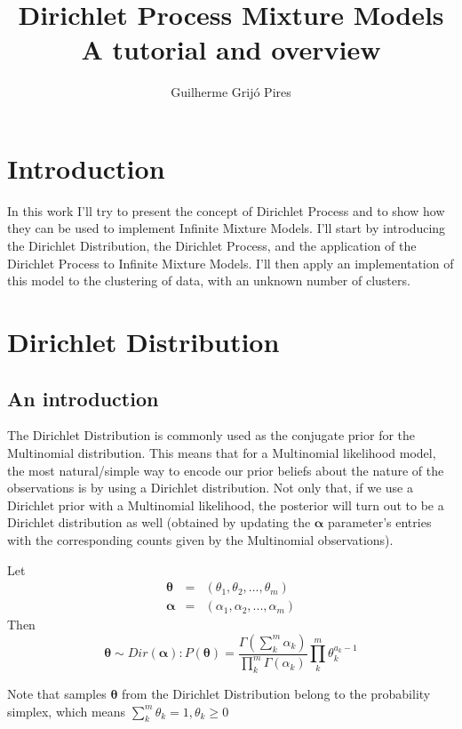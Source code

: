 \documentclass[11pt]{article}
\title{%
	Dirichlet Process Mixture Models\\
	\large A tutorial and overview
}
\author{Guilherme Grijó Pires}
\date{}
\begin{document}
\maketitle

\section{Introduction}\label{introduction}

In this work I'll try to present the concept of Dirichlet Process and to
show how they can be used to implement Infinite Mixture Models. I'll
start by introducing the Dirichlet Distribution, the Dirichlet Process,
and the application of the Dirichlet Process to Infinite Mixture Models.
I'll then apply an implementation of this model to the clustering of
data, with an unknown number of clusters.
	
\section{Dirichlet Distribution}\label{dirichlet-distribution}
	
\subsection{An introduction}\label{an-introduction}

The Dirichlet Distribution is commonly used as the conjugate prior for
the Multinomial distribution. This means that for a Multinomial
likelihood model, the most natural/simple way to encode our prior
beliefs about the nature of the observations is by using a Dirichlet
distribution. Not only that, if we use a Dirichlet prior with a
Multinomial likelihood, the posterior will turn out to be a Dirichlet
distribution as well (obtained by updating the \(\boldsymbol\alpha\)
parameter's entries with the corresponding counts given by the
Multinomial observations).
	
Let \begin{eqnarray}
\boldsymbol\theta &=& (\theta_1 , \theta_2, ..., \theta_m) \nonumber \\
\boldsymbol\alpha &=& (\alpha_1 , \alpha_2, ..., \alpha_m) \nonumber
\end{eqnarray} Then \[\boldsymbol\theta \sim Dir(\boldsymbol\alpha) : 
P(\boldsymbol\theta)=\frac{\Gamma(\sum_{k}^{m} \alpha_k)}{\prod_{k}^{m}\Gamma(\alpha_k)}\prod_{k}^{m}\theta_{k}^{a_k -1}\]
	
Note that samples \(\boldsymbol\theta\) from the Dirichlet Distribution
belong to the probability simplex, which means
\(\sum_{k}^{m}\theta_k = 1, \theta_k \geq 0\)
\end{document}
